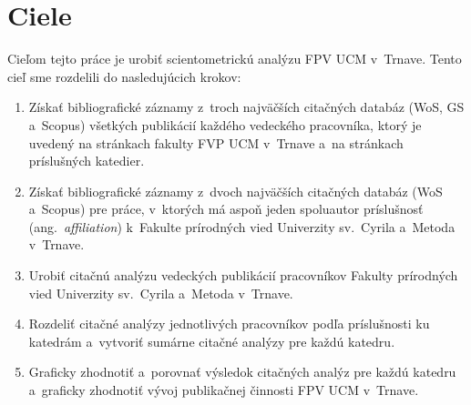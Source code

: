 \chapter{Ciele}
\label{chap:objectives}

Cieľom tejto práce je urobiť scientometrickú analýzu FPV UCM v~Trnave.  Tento
cieľ sme rozdelili do nasledujúcich krokov:

\begin{enumerate}
\item Získať bibliografické záznamy z~troch najväčších citačných databáz (WoS,
  GS a~Scopus) všetkých publikácií každého vedeckého pracovníka, ktorý je
  uvedený na stránkach fakulty FVP UCM v~Trnave a~na stránkach príslušných
  katedier.
\item Získať bibliografické záznamy z~dvoch najväčších citačných databáz (WoS
  a~Scopus) pre práce, v~ktorých má aspoň jeden spoluautor príslušnosť
  (ang.~\emph{affiliation}) k~Fakulte prírodných vied Univerzity sv.~Cyrila
  a~Metoda v~Trnave.
\item Urobiť citačnú analýzu vedeckých publikácií pracovníkov Fakulty prírodných
  vied Univerzity sv.~Cyrila a~Metoda v~Trnave.
\item Rozdeliť citačné analýzy jednotlivých pracovníkov podľa príslušnosti ku
  katedrám a~vytvoriť sumárne citačné analýzy pre každú katedru.
\item Graficky zhodnotiť a~porovnať výsledok citačných analýz pre každú katedru
  a~graficky zhodnotiť vývoj publikačnej činnosti FPV UCM v~Trnave.
\end{enumerate}


